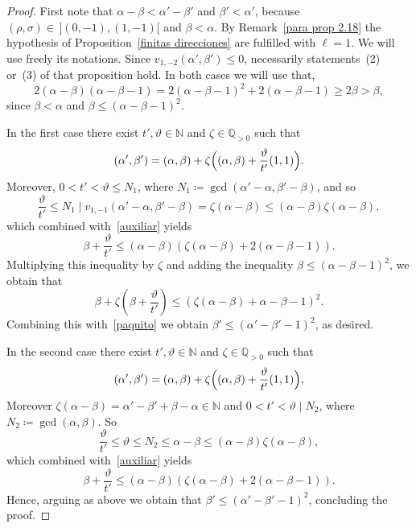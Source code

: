\documentclass[reqno,a4paper]{amsart}
\theoremstyle{definition}
\theoremstyle{remark}
\begin{document}
\begin{proof} First note that $\alpha-\beta<\alpha'-\beta'$ and $\beta'<\alpha'$, because $(\rho,\sigma)\in\hspace{2pt} ](0,-1),(1,-1)[$ and $\beta<\alpha$. By Remark~\ref{para prop 2.18} the hypothesis of Proposition~\ref{finitas direcciones} are fulfilled with $\ell =1$. We will use freely its notations. Since $v_{1,-2}(\alpha',\beta')\le 0$, necessarily statements~(2) or~(3) of that proposition hold. In both cases we will use that,
\begin{equation}\label{auxiliar}
2(\alpha-\beta)(\alpha-\beta-1)= 2(\alpha-\beta-1)^2 + 2(\alpha-\beta-1)\ge 2\beta >\beta,
\end{equation}
since $\beta<\alpha$ and $\beta\le (\alpha - \beta - 1)^2$.

\smallskip

In the first case there exist $t',\vartheta\in \mathds{N}$ and $\zeta\in \mathds{Q}_{>0}$ such that
\begin{equation}\label{paquito}
(\alpha',\beta')=(\alpha,\beta)+\zeta\Bigl((\alpha,\beta)+\frac{\vartheta}{t'}(1,1)\Bigr).
\end{equation}
Moreover, $0<t'<\vartheta\le N_1$, where $N_1\coloneqq \gcd(\alpha'-\alpha,\beta'-\beta)$, and so
$$
\frac{\vartheta}{t'}\le N_1 \mid v_{1,-1}(\alpha'-\alpha,\beta'-\beta)=\zeta(\alpha-\beta)\le (\alpha-\beta)\zeta(\alpha-\beta),
$$
which combined with~\eqref{auxiliar} yields
$$
\beta +\frac{\vartheta}{t'}\le(\alpha - \beta)(\zeta(\alpha - \beta)+2(\alpha - \beta - 1)).
$$
Multiplying this inequality by $\zeta$ and adding the inequality $\beta\le (\alpha - \beta - 1)^2$, we obtain that
$$
\beta + \zeta\left(\beta + \frac{\vartheta}{t'}\right)\le(\zeta(\alpha - \beta) + \alpha - \beta - 1)^2.
$$
Combining this with~\eqref{paquito} we obtain $\beta'\le (\alpha' - \beta' - 1)^2$, as desired.

\smallskip

In the second case there exist $t',\vartheta\in \mathds{N}$ and $\zeta\in \mathds{Q}_{>0}$ such that
$$
(\alpha',\beta')=(\alpha,\beta)+\zeta\Bigl((\alpha,\beta)+\frac{\vartheta}{t'}(1,1)\Bigr),
$$
Moreover $\zeta (\alpha - \beta) = \alpha' - \beta' + \beta-\alpha\in\mathds{N}$  and $0<t'<\vartheta\mid N_2$, where $N_2\coloneqq \gcd(\alpha,\beta)$. So
$$
\frac{\vartheta}{t'}\le \vartheta\le N_2 \le \alpha - \beta \le (\alpha - \beta) \zeta(\alpha - \beta),
$$
which combined with~\eqref{auxiliar} yields
$$
\beta +\frac{\vartheta}{t'} \le (\alpha - \beta)(\zeta (\alpha - \beta) + 2(\alpha - \beta - 1)).
$$
Hence, arguing as above we obtain that $\beta' \le (\alpha' - \beta' - 1)^2$, concluding the proof.
\end{proof}
\end{document}
